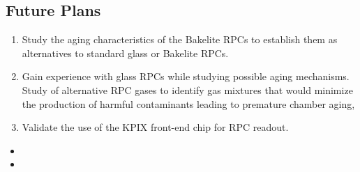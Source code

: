 \subsection{Future Plans}
\begin{enumerate}
\item Study the aging characteristics of the Bakelite RPCs to establish them as alternatives to standard glass or Bakelite RPCs.
\item Gain experience with glass RPCs while studying possible aging mechanisms. Study of alternative RPC gases to identify gas mixtures that would minimize the production of harmful contaminants leading to premature chamber aging,
\item Validate the use of the KPIX front-end chip for RPC readout.
\end{enumerate}

\begin{itemize}
	\item {}
	\item {}
\end{itemize}
